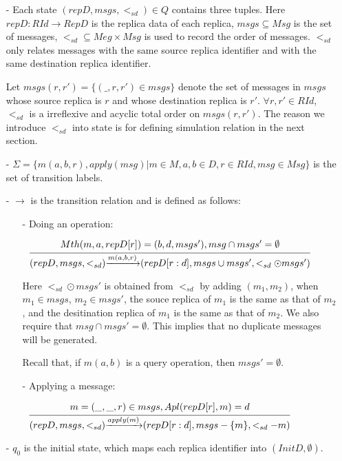 \begin{itemize}
\setlength{\itemsep}{0.5pt}
\item[-] Each state $(repD,msgs,<_{sd}) \in Q$ contains three tuples. Here $repD: RId \rightarrow RepD$ is the replica data of each replica, $msgs \subseteq Msg$ is the set of messages, $<_{sd} \subseteq Meg \times Msg$ is used to record the order of messages. $<_{sd}$ only relates messages with the same source replica identifier and with the same destination replica identifier.

Let $msgs(r,r') = \{ (\_,r,r') \in msgs \}$ denote the set of messages in $msgs$ whose source replica is $r$ and whose destination replica is $r'$. $\forall r,r' \in RId$, $<_{sd}$ is a irreflexive and acyclic total order on $msgs(r,r')$. %
The reason we introduce $<_{sd}$ into state is for defining simulation relation in the next section.

\item[-] $\Sigma = \{ m(a,b,r), apply(msg) \vert m \in M, a,b \in D, r \in RId, msg \in Msg \}$ is the set of transition labels.

\item[-] $\rightarrow$ is the transition relation and is defined as follows:

    \begin{itemize}
    \setlength{\itemsep}{0.5pt}
    \item[-] Doing an operation:

    $\begin{array}{l c} \bigfrac{ Mth(m,a,repD[r]) = (b,d,msgs'), msg \cap msgs' = \emptyset} {(repD,msgs,<_{sd}) {\xrightarrow{m(a,b,r)}} (repD[r:d],msgs \cup msgs',<_{sd} \odot msgs')} \end{array}$

    Here $<_{sd} \odot msgs'$ is obtained from $<_{sd}$ by adding  $(m_1,m_2)$, when $m_1 \in msgs$, $m_2 \in msgs'$, the souce replica of $m_1$ is the same as that of $m_2$, and the desitination replica of $m_1$ is the same as that of $m_2$. {\color {red} We also require that $msg \cap msgs' = \emptyset$. This implies that no duplicate messages will be generated.}

    Recall that, if $m(a,b)$ is a query operation, then $msgs' = \emptyset$.

    \item[-] Applying a message:

    $\begin{array}{l c} \bigfrac{ m = (\_,\_,r) \in msgs,Apl(repD[r],m) = d } {(repD,msgs,<_{sd}) {\xrightarrow{apply(m)}} (repD[r:d],msgs - \{ m \},<_{sd}-m )} \end{array}$
    \end{itemize}

\item[-] $q_0$ is the initial state, which maps each replica identifier into $(InitD,\emptyset)$.
\end{itemize}

